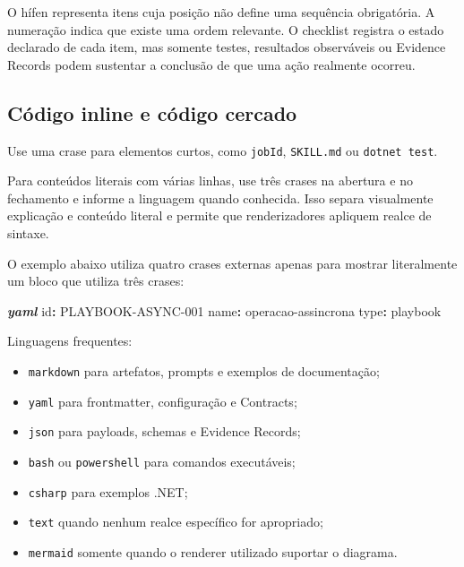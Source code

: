 \documentclass[
  10pt,
  a4paper,
  oneside]{book}
\newenvironment{Shaded}{}{}
\newcommand{\AttributeTok}[1]{\textcolor[rgb]{0.49,0.56,0.16}{#1}}
\newcommand{\FunctionTok}[1]{\textcolor[rgb]{0.02,0.16,0.49}{#1}}
\newcommand{\InformationTok}[1]{\textcolor[rgb]{0.38,0.63,0.69}{\textbf{\textit{#1}}}}
\newcommand{\KeywordTok}[1]{\textcolor[rgb]{0.00,0.44,0.13}{\textbf{#1}}}
\providecommand{\tightlist}{%
  \setlength{\itemsep}{0pt}\setlength{\parskip}{0pt}}
\renewenvironment{Shaded}{\begin{snugshade}}{\end{snugshade}}%
\begin{document}
O hífen representa itens cuja posição não define uma sequência
obrigatória. A numeração indica que existe uma ordem relevante. O
checklist registra o estado declarado de cada item, mas somente testes,
resultados observáveis ou Evidence Records podem sustentar a conclusão
de que uma ação realmente ocorreu.

\hypertarget{cuxf3digo-inline-e-cuxf3digo-cercado}{%
\subsection{Código inline e código
cercado}\label{cuxf3digo-inline-e-cuxf3digo-cercado}}

Use uma crase para elementos curtos, como
\texttt{\textasciigrave{}jobId\textasciigrave{}},
\texttt{\textasciigrave{}SKILL.md\textasciigrave{}} ou
\texttt{\textasciigrave{}dotnet\ test\textasciigrave{}}.

Para conteúdos literais com várias linhas, use três crases na abertura e
no fechamento e informe a linguagem quando conhecida. Isso separa
visualmente explicação e conteúdo literal e permite que renderizadores
apliquem realce de sintaxe.

O exemplo abaixo utiliza quatro crases externas apenas para mostrar
literalmente um bloco que utiliza três crases:

\begin{Shaded}
\begin{Highlighting}[]
\InformationTok{\textasciigrave{}\textasciigrave{}\textasciigrave{}yaml}
\FunctionTok{id}\KeywordTok{:}\AttributeTok{ PLAYBOOK{-}ASYNC{-}001}
\FunctionTok{name}\KeywordTok{:}\AttributeTok{ operacao{-}assincrona}
\FunctionTok{type}\KeywordTok{:}\AttributeTok{ playbook}
\InformationTok{\textasciigrave{}\textasciigrave{}\textasciigrave{}}
\end{Highlighting}
\end{Shaded}

Linguagens frequentes:

\begin{itemize}
\tightlist
\item
  \texttt{markdown} para artefatos, prompts e exemplos de documentação;
\item
  \texttt{yaml} para frontmatter, configuração e Contracts;
\item
  \texttt{json} para payloads, schemas e Evidence Records;
\item
  \texttt{bash} ou \texttt{powershell} para comandos executáveis;
\item
  \texttt{csharp} para exemplos .NET;
\item
  \texttt{text} quando nenhum realce específico for apropriado;
\item
  \texttt{mermaid} somente quando o renderer utilizado suportar o
  diagrama.
\end{itemize}
\end{document}

